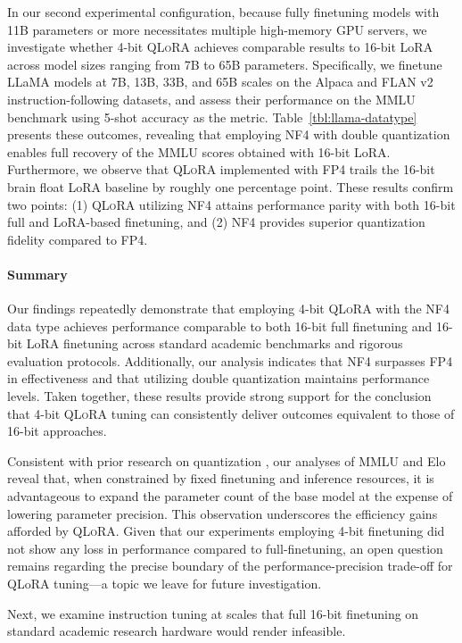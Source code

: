 In our second experimental configuration, because fully finetuning models with 11B parameters or more necessitates multiple high-memory GPU servers, we investigate whether 4-bit \textsc{QLoRA} achieves comparable results to 16-bit LoRA across model sizes ranging from 7B to 65B parameters. Specifically, we finetune LLaMA models at 7B, 13B, 33B, and 65B scales on the Alpaca and FLAN v2 instruction-following datasets, and assess their performance on the MMLU benchmark using 5-shot accuracy as the metric. Table~\ref{tbl:llama-datatype} presents these outcomes, revealing that employing NF4 with double quantization enables full recovery of the MMLU scores obtained with 16-bit LoRA. Furthermore, we observe that \textsc{QLoRA} implemented with FP4 trails the 16-bit brain float LoRA baseline by roughly one percentage point. These results confirm two points: (1) \textsc{QLoRA} utilizing NF4 attains performance parity with both 16-bit full and LoRA-based finetuning, and (2) NF4 provides superior quantization fidelity compared to FP4.

\paragraph{Summary} Our findings repeatedly demonstrate that employing 4-bit \textsc{QLoRA} with the NF4 data type achieves performance comparable to both 16-bit full finetuning and 16-bit LoRA finetuning across standard academic benchmarks and rigorous evaluation protocols. Additionally, our analysis indicates that NF4 surpasses FP4 in effectiveness and that utilizing double quantization maintains performance levels. Taken together, these results provide strong support for the conclusion that 4-bit \textsc{QLoRA} tuning can consistently deliver outcomes equivalent to those of 16-bit approaches.

Consistent with prior research on quantization \citep{dettmers2022case}, our analyses of MMLU and Elo reveal that, when constrained by fixed finetuning and inference resources, it is advantageous to expand the parameter count of the base model at the expense of lowering parameter precision. This observation underscores the efficiency gains afforded by \textsc{QLoRA}. Given that our experiments employing 4-bit finetuning did not show any loss in performance compared to full-finetuning, an open question remains regarding the precise boundary of the performance-precision trade-off for QLoRA tuning—a topic we leave for future investigation.

Next, we examine instruction tuning at scales that full 16-bit finetuning on standard academic research hardware would render infeasible.

